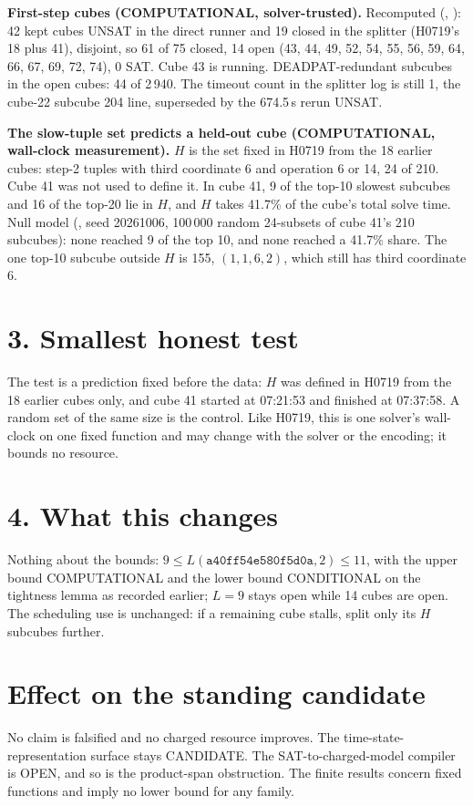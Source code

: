 \documentclass[11pt]{article}
\begin{document}
\textbf{First-step cubes (COMPUTATIONAL, solver-trusted).} Recomputed (, ): 42 kept cubes UNSAT in the direct runner and 19 closed in the splitter (H0719's 18 plus 41), disjoint, so 61 of 75 closed, 14 open (43, 44, 49, 52, 54, 55, 56, 59, 64, 66, 67, 69, 72, 74), 0 SAT. Cube 43 is running. DEADPAT-redundant subcubes in the open cubes: 44 of 2\,940. The timeout count in the splitter log is still 1, the cube-22 subcube 204 line, superseded by the 674.5\,s rerun UNSAT.

\textbf{The slow-tuple set predicts a held-out cube (COMPUTATIONAL, wall-clock measurement).} $H$ is the set fixed in H0719 from the 18 earlier cubes: step-2 tuples with third coordinate 6 and operation 6 or 14, 24 of 210. Cube 41 was not used to define it. In cube 41, 9 of the top-10 slowest subcubes and 16 of the top-20 lie in $H$, and $H$ takes 41.7\% of the cube's total solve time. Null model (, seed 20261006, 100\,000 random 24-subsets of cube 41's 210 subcubes): none reached 9 of the top 10, and none reached a 41.7\% share. The one top-10 subcube outside $H$ is 155, $(1,1,6,2)$, which still has third coordinate 6.

\section*{3. Smallest honest test}
The test is a prediction fixed before the data: $H$ was defined in H0719 from the 18 earlier cubes only, and cube 41 started at 07:21:53 and finished at 07:37:58. A random set of the same size is the control. Like H0719, this is one solver's wall-clock on one fixed function and may change with the solver or the encoding; it bounds no resource.

\section*{4. What this changes}
Nothing about the bounds: $9\le L(\texttt{a40ff54e580f5d0a},2)\le 11$, with the upper bound COMPUTATIONAL and the lower bound CONDITIONAL on the tightness lemma as recorded earlier; $L=9$ stays open while 14 cubes are open. The scheduling use is unchanged: if a remaining cube stalls, split only its $H$ subcubes further.

\section*{Effect on the standing candidate}
No claim is falsified and no charged resource improves. The time-state-representation surface stays CANDIDATE. The SAT-to-charged-model compiler is OPEN, and so is the product-span obstruction. The finite results concern fixed functions and imply no lower bound for any family.
\end{document}
